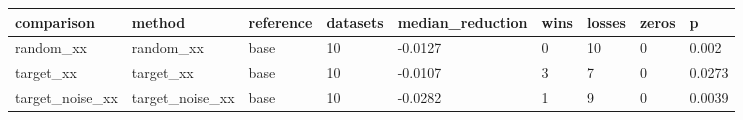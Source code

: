 \begin{tabular}{lllllllll}
\toprule
comparison & method & reference & datasets & median\_reduction & wins & losses & zeros & p \\
\midrule
random\_xx & random\_xx & base & 10 & -0.0127 & 0 & 10 & 0 & 0.002 \\
target\_xx & target\_xx & base & 10 & -0.0107 & 3 & 7 & 0 & 0.0273 \\
target\_noise\_xx & target\_noise\_xx & base & 10 & -0.0282 & 1 & 9 & 0 & 0.0039 \\
\bottomrule
\end{tabular}
